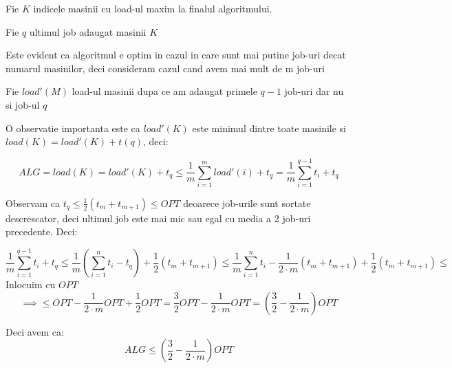 \documentclass[a4paper]{report}
\begin{document}
Fie $K$ indicele masinii cu load-ul maxim la finalul algoritmului.

Fie $q$ ultimul job adaugat masinii $K$

Este evident ca algoritmul e optim in cazul in care sunt mai putine job-uri decat numarul masinilor, deci consideram cazul cand  avem mai mult de m job-uri

Fie $load'(M)$ load-ul masinii dupa ce am adaugat primele $q-1$ job-uri dar nu si job-ul $q$

O observatie importanta este ca $load'(K)$ este minimul dintre toate masinile si $load(K)=load'(K)+t(q)$, deci:

\[ALG=load(K)=load'(K)+t_{q}\leq \frac{1}{m}\sum_{i=1}^{m}load'(i)+t_{q}=\frac{1}{m}\sum_{i=1}^{q-1}t_{i}+t_{q} \]

Observam ca $t_{q}\leq \frac{1}{2}(t_{m} + t_{m+1})\leq OPT$ deoarece job-urile sunt sortate descrescator, deci ultimul job este mai mic sau egal cu media a 2 job-uri precedente. Deci:

\[\frac{1}{m}\sum_{i=1}^{q-1}t_{i} + t_{q} \leq \frac{1}{m}(\sum_{i=1}^{n}t_{i} - t_{q}) + \frac{1}{2}(t_{m}+t_{m+1})\leq \frac{1}{m}\sum_{i=1}^{n}t_{i}-\frac{1}{2\cdot m}(t_{m}+t_{m+1})+\frac{1}{2}(t_{m}+t_{m+1})\leq\]
Inlocuim cu $OPT$
\[\implies \leq OPT-\frac{1}{2\cdot m}OPT + \frac{1}{2}OPT = \frac{3}{2}OPT - \frac{1}{2\cdot m}OPT = (\frac{3}{2}-\frac{1}{2\cdot m})OPT\]

Deci avem ca:\[ALG\leq (\frac{3}{2}-\frac{1}{2\cdot m})OPT\]
\end{document}

